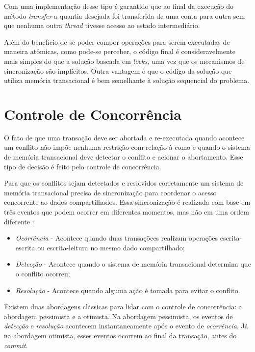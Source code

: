 Com uma implementação desse tipo é garantido que ao final da execução do método \emph{transfer} a quantia desejada foi transferida de uma conta para outra sem que nenhuma outra \emph{thread} tivesse acesso ao estado intermediário.

Além do benefício de se poder compor operações para serem executadas de maneira atômicas, como pode-se perceber, o código final é consideravelmente mais simples do que a solução baseada em \emph{locks}, uma vez que os mecanismos de sincronização são implícitos. Outra vantagem é que o código da solução que utiliza memória transacional é bem semelhante à solução sequencial do problema.


\section{Controle de Concorrência}

O fato de que uma transação deve ser abortada e re-executada quando acontece um conflito não impõe nenhuma restrição com relação à como e quando o sistema de memória transacional deve detectar o conflito e acionar o abortamento. Esse tipo de decisão é feito pelo controle de concorrência.

Para que os conflitos sejam detectados e resolvidos corretamente um sistema de memória transacional precisa de sincronização para coordenar o acesso concorrente ao dados compartilhados. Essa sincronização é realizada com base em três eventos que podem ocorrer em diferentes momentos, mas não em uma ordem diferente \cite{harris2010transactional}:

\begin{itemize}
 \item \emph{Ocorrência} - Acontece quando duas transaçõees realizam operações escrita-escrita ou escrita-leitura no mesmo dado compartilhado;
 \item \emph{Detecção} - Acontece quando o sistema de memória transacional determina que o conflito ocorreu;
 \item \emph{Resolução} - Acontece quando alguma ação é tomada para evitar o conflito.
\end{itemize}

Existem duas abordagens clássicas para lidar com o controle de concorrência: a abordagem pessimista e a otimista. Na abordagem pessimista, os eventos de \emph{detecção} e \emph{resolução} acontecem instantaneamente após o evento de \emph{ocorrência}. Já na abordagem otimista, esses eventos ocorrem ao final da transação, antes do \emph{commit}.

